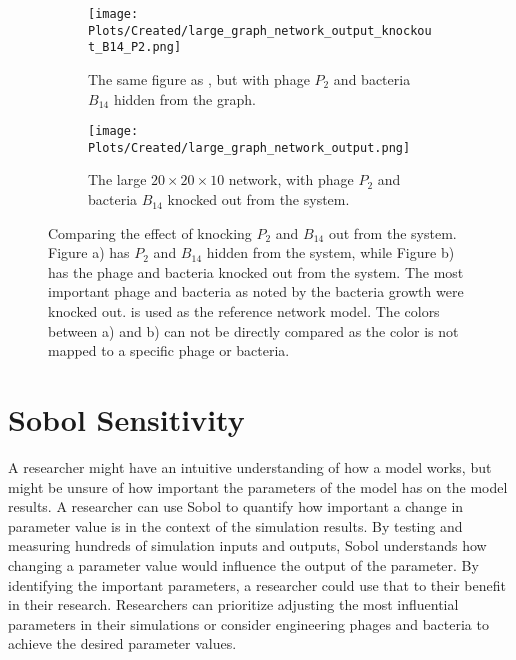 \begin{figure}
    \centering
    \begin{subfigure}{0.49\linewidth}
        \centering
        \texttt{[image: Plots/Created/large\_graph\_network\_output\_knockout\_B14\_P2.png]}
        \caption{
            The same figure as , but with phage $P_2$ and bacteria $B_14$ hidden from the graph. 
        }
        \label{fig:created:large_graph_network_output_hidden_B14_P2}
    \end{subfigure}
    \hfill
    \begin{subfigure}{0.49\linewidth}
        \centering
        \texttt{[image: Plots/Created/large\_graph\_network\_output.png]}
        \caption{
            The large $20\times 20\times 10$ network, with phage $P_2$ and bacteria $B_14$ knocked out from the system.
        }
        \label{fig:created:large_graph_network_output_knockout_B14_P2}
    \end{subfigure}
    \caption{
        Comparing the effect of knocking $P_2$ and $B_14$ out from the system. 
        Figure a) has $P_2$ and $B_14$ hidden from the system, while Figure b) has the phage and bacteria knocked out from the system. 
        The most important phage and bacteria as noted by the bacteria growth were knocked out. 
         is used as the reference network model. 
        The colors between a) and b) can not be directly compared as the color is not mapped to a specific phage or bacteria. 
    }
\end{figure}

\section{Sobol Sensitivity}
A researcher might have an intuitive understanding of how a model works, but might be unsure of how important the parameters of the model has on the model results.  
A researcher can use Sobol to quantify how important a change in parameter value is in the context of the simulation results. 
By testing and measuring hundreds of simulation inputs and outputs, Sobol understands how changing a parameter value would influence the output of the parameter. 
By identifying the important parameters, a researcher could use that to their benefit in their research. 
Researchers can prioritize adjusting the most influential parameters in their simulations or consider engineering phages and bacteria to achieve the desired parameter values.

